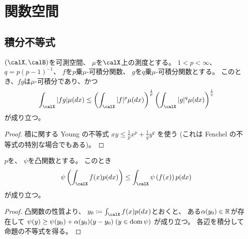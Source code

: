 \documentclass[report]{jlreq}
\begin{document}
\chapter{関数空間}

%
\section{積分不等式}

\begin{proposition}
    $(\calX, \calB)$を可測空間、
    $\mu$を$\calX$上の測度とする。
    $1 < p < \infty$、$q = p(p - 1)^{-1}$、
    $f$を$p$乗$\mu$-可積分関数、
    $g$を$q$乗$\mu$-可積分関数とする。
    このとき、$fg$は$\mu$-可積分であり、かつ
    \begin{equation}
        \int_\calX |fg| \mu(dx)
            \le \myparen{
                \int_\calX |f|^{p} \mu(dx)
            }^{\frac{1}{p}}
            \myparen{
                \int_\calX |g|^{q} \mu(dx)
            }^{\frac{1}{q}}
    \end{equation}
    が成り立つ。
\end{proposition}

\begin{proof}
    積に関する Young の不等式
    $xy \le \frac{1}{p} x^p + \frac{1}{q} y^q$
    を使う (これは Fenchel の不等式の特別な場合でもある)。
\end{proof}

\begin{proposition}
    $p$を、
    $\psi$を凸関数とする。
    このとき
    \begin{equation}
        \psi\myparen{
            \int_\calX f(x) p(dx)
        }
            \le
                \int_\calX \psi\myparen{
                    f(x)
                } p(dx)
    \end{equation}
    が成り立つ。
\end{proposition}

\begin{proof}
    凸関数の性質より、
    $y_0 \coloneqq \int_\calX f(x) p(dx)$とおくと、
    ある$\alpha(y_0) \in \mathbb{R}$が存在して
    $\psi(y) \ge \psi(y_0) + \alpha(y_0) (y - y_0) \; (y \in \operatorname{dom}\psi)$
    が成り立つ。
    各辺を積分して命題の不等式を得る。
\end{proof}

%
\end{document}
